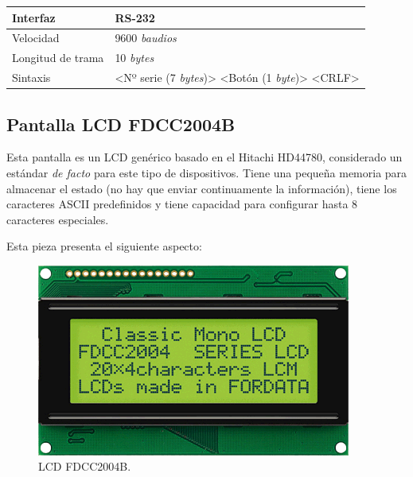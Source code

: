 \begin{center}
	\begin{tabular}{|l|l|}
		\hline Interfaz & RS-232 \\
		\hline Velocidad & 9600 \textit{baudios} \\ 
		\hline Longitud de trama & 10 \textit{bytes} \\ 
		\hline Sintaxis & <Nº serie (7 \textit{bytes})> <Botón (1 \textit{byte})> <CRLF> \\ 
		\hline 
	\end{tabular} 
\end{center}

\subsection{Pantalla LCD FDCC2004B}

Esta pantalla es un LCD genérico basado en el Hitachi HD44780, considerado un estándar \textit{de facto} para este tipo de dispositivos. Tiene una pequeña memoria para almacenar el estado (no hay que enviar continuamente la información), tiene los caracteres ASCII predefinidos y tiene capacidad para configurar hasta 8 caracteres especiales.

Esta pieza presenta el siguiente aspecto:

\smallskip

\begin{figure}[H]
	\noindent \begin{centering}
		\includegraphics[width=\linewidth/2]{capitulo3/FDCC2004B}
		\par\end{centering}
	\smallskip
	\caption{\label{fig:FDCC2004B} LCD FDCC2004B.}
\end{figure} 

